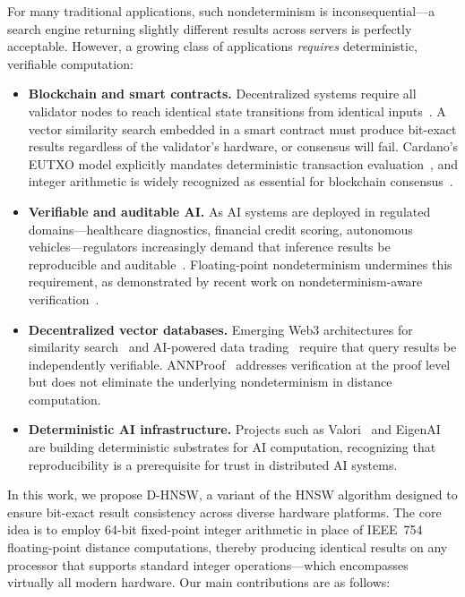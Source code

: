 \documentclass[10pt,journal,compsoc]{IEEEtran}
\newcommand{\dhnsw}{\textsc{D-HNSW}}
\newcommand{\hnsw}{\textsc{HNSW}}
\begin{document}
For many traditional applications, such nondeterminism is inconsequential---a search engine returning slightly different results across servers is perfectly acceptable. However, a growing class of applications \emph{requires} deterministic, verifiable computation:

\begin{itemize}[leftmargin=*]
  \item \textbf{Blockchain and smart contracts.} Decentralized systems require all validator nodes to reach identical state transitions from identical inputs~\cite{buterin2014ethereum, lai2022blockchain}. A vector similarity search embedded in a smart contract must produce bit-exact results regardless of the validator's hardware, or consensus will fail. Cardano's EUTXO model explicitly mandates deterministic transaction evaluation~\cite{cardano2024fees}, and integer arithmetic is widely recognized as essential for blockchain consensus~\cite{decenomy2024integer}.

  \item \textbf{Verifiable and auditable AI.} As AI systems are deployed in regulated domains---healthcare diagnostics, financial credit scoring, autonomous vehicles---regulators increasingly demand that inference results be reproducible and auditable~\cite{alves2026eigenai}. Floating-point nondeterminism undermines this requirement, as demonstrated by recent work on nondeterminism-aware verification~\cite{yao2025nao}.

  \item \textbf{Decentralized vector databases.} Emerging Web3 architectures for similarity search~\cite{keizer2023ditto, lee2024decentface} and AI-powered data trading~\cite{zhang2024nmft} require that query results be independently verifiable. ANNProof~\cite{lu2024annproof} addresses verification at the proof level but does not eliminate the underlying nondeterminism in distance computation.

  \item \textbf{Deterministic AI infrastructure.} Projects such as Valori~\cite{gudur2025valori} and EigenAI~\cite{alves2026eigenai} are building deterministic substrates for AI computation, recognizing that reproducibility is a prerequisite for trust in distributed AI systems.
\end{itemize}

\noindent In this work, we propose \dhnsw{}, a variant of the \hnsw{} algorithm designed to ensure bit-exact result consistency across diverse hardware platforms. The core idea is to employ 64-bit fixed-point integer arithmetic in place of IEEE~754 floating-point distance computations, thereby producing identical results on any processor that supports standard integer operations---which encompasses virtually all modern hardware. Our main contributions are as follows:
\end{document}
